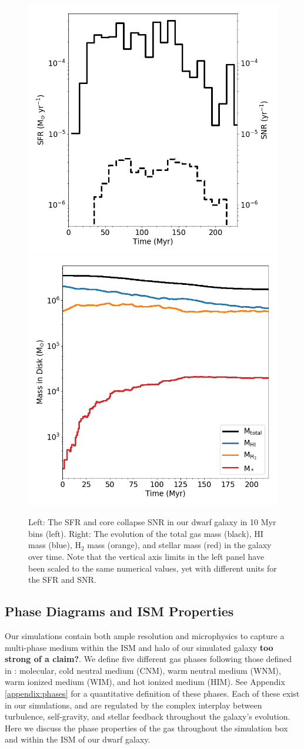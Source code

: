 \documentclass[twocolumn]{aastex61}
\begin{document}
\begin{figure}
\centering
\includegraphics[width=0.475\linewidth]{sfr_snr}
\includegraphics[width=0.475\linewidth]{mass_evolution}
\caption{Left: The SFR and core collapse SNR in our dwarf galaxy in 10 Myr bins (left). Right: The evolution of the total gas mass (black), HI mass (blue), H$_2$ mass (orange), and stellar mass (red) in the galaxy over time. Note that the vertical axis limits in the left panel have been scaled to the same numerical values, yet with different units for the SFR and SNR.}
\label{fig:sfr_mass_evolution}
\end{figure}

\subsection{Phase Diagrams and ISM Properties}
\label{sec:phase}

Our simulations contain both ample resolution and microphysics to capture a multi-phase medium within the ISM and halo of our simulated galaxy \textbf{too strong of a claim?}. We define five different gas phases following those defined in \citep{Draine2011}: molecular, cold neutral medium (CNM), warm neutral medium (WNM), warm ionized medium (WIM), and hot ionized medium (HIM). See Appendix \ref{appendix:phases} for a quantitative definition of these phases. Each of these exist in our simulations, and are regulated by the complex interplay between turbulence, self-gravity, and stellar feedback throughout the galaxy's evolution. Here we discuss the phase properties of the gas throughout the simulation box and within the ISM of our dwarf galaxy.
\end{document}

